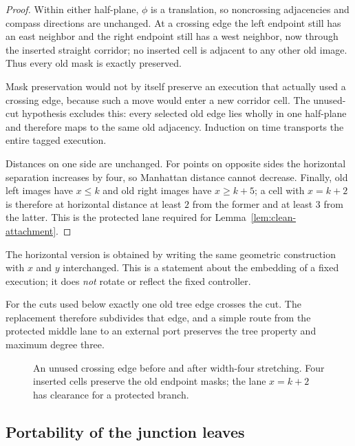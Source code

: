 \begin{proof}
Within either half-plane, $\phi$ is a translation, so noncrossing adjacencies and
compass directions are unchanged.  At a crossing edge the left endpoint still has an
east neighbor and the right endpoint still has a west neighbor, now through the
inserted straight corridor; no inserted cell is adjacent to any other old image.
Thus every old mask is exactly preserved.

Mask preservation would not by itself preserve an execution that actually used a
crossing edge, because such a move would enter a new corridor cell.  The unused-cut
hypothesis excludes this: every selected old edge lies wholly in one half-plane and
therefore maps to the same old adjacency.  Induction on time transports the entire
tagged execution.

Distances on one side are unchanged.  For points on opposite sides the horizontal
separation increases by four, so Manhattan distance cannot decrease.  Finally, old
left images have $x\le k$ and old right images have $x\ge k+5$; a cell with $x=k+2$
is therefore at horizontal distance at least $2$ from the former and at least $3$
from the latter.  This is the protected lane required for Lemma~\ref{lem:clean-attachment}.
\end{proof}

The horizontal version is obtained by writing the same geometric construction with
$x$ and $y$ interchanged.  This is a statement about the embedding of a fixed execution;
it does \emph{not} rotate or reflect the fixed controller.

For the cuts used below exactly one old tree edge crosses the cut.  The replacement
therefore subdivides that edge, and a simple route from the protected middle lane to an
external port preserves the tree property and maximum degree three.

\begin{figure}[t]
\centering

\caption{An unused crossing edge before and after width-four stretching. Four inserted
cells preserve the old endpoint masks; the lane $x=k+2$ has clearance for a protected
branch.}
\label{fig:cut-stretching}
\end{figure}

\subsection{Portability of the junction leaves}
\label{subsubsec:junction-portability}

